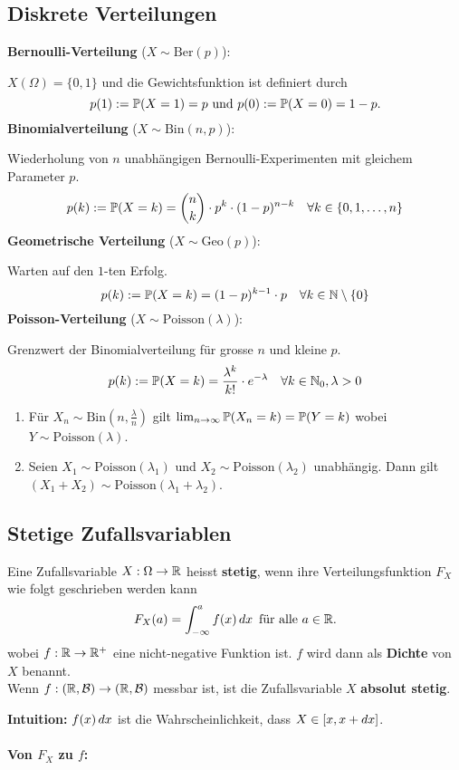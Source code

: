 \subsection{Diskrete Verteilungen}
\textbf{Bernoulli-Verteilung} ($X \sim \text{Ber}(p)$): 

$X(\Omega)= \{0, 1\}$ und die Gewichtsfunktion ist definiert durch
$$p(1):= \P(X = 1) = p \text{ und } p(0):=\P(X = 0) = 1 - p.$$
\textbf{Binomialverteilung} ($X \sim \text{Bin}(n, p)$): 

Wiederholung von $n$ unabhängigen Bernoulli-Experimenten mit gleichem Parameter $p$. 
$$p(k):= \P(X = k) = \binom{n}{k} \cdot p^k \cdot (1-p)^{n-k} \quad \forall k \in \{0,1,\ldots, n\}$$
\textbf{Geometrische Verteilung} ($X \sim \text{Geo}(p)$): 

Warten auf den $1$-ten Erfolg. 
$$p(k):= \P(X = k) = (1-p)^{k-1}\cdot p \quad \forall k \in \N\setminus\{0\}$$
\textbf{Poisson-Verteilung} ($X \sim \text{Poisson}(\lambda)$): 

Grenzwert der Binomialverteilung für grosse $n$ und kleine $p$. 
$$p(k) := \P(X = k) = \frac{\lambda^k}{k!}\cdot e^{-\lambda} \quad \forall k \in \N_0, \lambda > 0$$
\begin{enumerate}
    \item Für $X_n \sim \text{Bin}(n, \frac{\lambda}{n})$ gilt $\lim_{n \to \infty}\P(X_n = k) = \P(Y = k)$ wobei $Y \sim \text{Poisson}(\lambda)$.
    \item Seien $X_1 \sim \text{Poisson}(\lambda_1)$ und $X_2 \sim \text{Poisson}(\lambda_2)$ unabhängig. Dann gilt $(X_1 + X_2) \sim \text{Poisson}(\lambda_1 +\lambda_2)$.
\end{enumerate}

\subsection{Stetige Zufallsvariablen}
\begin{mainbox}{}
    Eine Zufallsvariable $X: \Omega \to \R$ heisst \textbf{stetig}, wenn ihre Verteilungsfunktion $F_X$ wie folgt geschrieben werden kann
    $$F_X(a) = \int_{-\infty}^{a}f(x)\dx \text{ für alle }a \in \R.$$
    wobei $f: \R \to \R^+$ eine nicht-negative Funktion ist. $f$ wird dann als \textbf{Dichte} von $X$ benannt.\\
    Wenn $f: (\R, \mathcal{B}) \to (\R, \mathcal{B})$ messbar ist, ist die Zufallsvariable $X$ \textbf{absolut stetig}.
\end{mainbox}
\textbf{Intuition:} $f(x)\dx$ ist die Wahrscheinlichkeit, dass $X \in [x, x + \dx]$.
\\ \\
\textbf{Von $F_X$ zu $f$:} 

